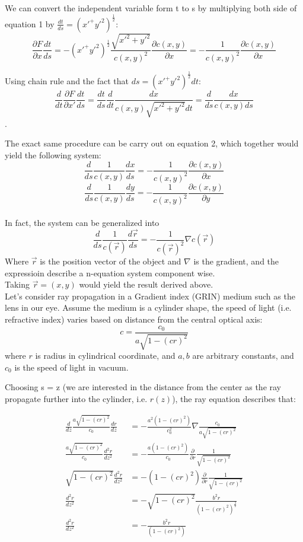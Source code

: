 \documentclass[%
 preprint,
 amsmath,amssymb,
 aps,
 pra,
 fleqn
]{revtex4-2}
\begin{document}
We can convert the independent variable form t to s by multiplying both side of equation 1 by $\frac{dt}{ds} = (x'^+y'^2)^{\frac{1}{2}}$:
$$\frac{\partial F}{\partial x}\frac{dt}{ds} = -(x'^+y'^2)^{\frac{1}{2}}\frac{\sqrt{x'^2+y'^2}}{c(x,y)^2}\frac{\partial c(x,y)}{\partial x} = -\frac{1}{c(x,y)^2}\frac{\partial c(x,y)}{\partial x}$$

Using chain rule and the fact that $ds = (x'^+y'^2)^{\frac{1}{2}} dt$:
$$\frac{d}{d t} \frac{\partial F}{\partial x'} \frac{dt}{ds} = \frac{dt}{ds}\frac{d}{dt} \frac{dx}{c(x,y)\sqrt{x'^2+y'^2}dt} = \frac{d}{ds}\frac{dx}{c(x,y)ds}$$.

The exact same procedure can be carry out on equation 2, which together would yield the following system:
$$\frac{d}{ds}\frac{1}{c(x,y)}\frac{dx}{ds} = -\frac{1}{c(x,y)^2}\frac{\partial c(x,y)}{\partial x}$$
$$\frac{d}{ds}\frac{1}{c(x,y)}\frac{dy}{ds} = -\frac{1}{c(x,y)^2}\frac{\partial c(x,y)}{\partial y}$$
\\

In fact, the system can be generalized into
$$\frac{d}{ds} \frac{1}{c(\vec{r})}\frac{d\vec{r}}{ds} = -\frac{1}{c(\vec{r})^2}\nabla c(\vec{r})$$
Where $\vec{r}$ is the position vector of the object and $\nabla$ is the gradient, and the expressioin describe a n-equation system component wise.\\

Taking $\vec{r} = (x,y)$ would yield the result derived above.\\

Let's consider ray propagation in a Gradient index (GRIN) medium such as the lens in our eye. Assume the medium is a cylinder shape, the speed of light (i.e. refractive index) varies based on distance from the central optical axis:
$$c = \frac{c_0}{a\sqrt{1-(cr)^2}}$$
where $r$ is radius in cylindrical coordinate, and $a,b$ are arbitrary constants, and $c_0$ is the speed of light in vacuum.

Choosing s = z (we are interested in the distance from the center as the ray propagate further into the cylinder, i.e. $r(z)$), the ray equation describes that:
\begin{ceqn}
    \begin{align*}
        \frac{d}{dz} \frac{a\sqrt{1-(cr)^2}}{c_0}\frac{d r}{dz} &= -\frac{a^2(1-(cr)^2)}{c_0^2}\nabla \frac{c_0}{a\sqrt{1-(cr)^2}}\\
        \frac{a\sqrt{1-(cr)^2}}{c_0}\frac{d^2 r}{dz^2} &= -\frac{a(1-(cr)^2)}{c_0}\frac{\partial}{\partial r} \frac{1}{\sqrt{1-(cr)^2}}\\
        \sqrt{1-(cr)^2}\frac{d^2 r}{dz^2} &= -(1-(cr)^2)\frac{\partial}{\partial r} \frac{1}{\sqrt{1-(cr)^2}}\\
        \frac{d^2 r}{dz^2} &= -\sqrt{1-(cr)^2} \frac{b^2r}{(1-(cr)^2)^{\frac{3}{2}}}\\
        \frac{d^2 r}{dz^2} &= -\frac{b^2r}{(1-(cr)^2)}\\
    \end{align*}
\end{ceqn}
\end{document}
